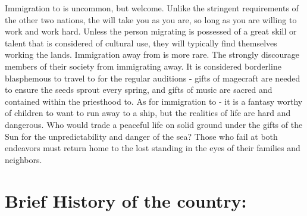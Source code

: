 \documentclass[blue]{GL2020}
\begin{document}
Immigration to \pFarm{} is uncommon, but welcome.  Unlike the stringent requirements of the other two nations, the \pFarm{} will take you as you are, so long as you are willing to work and work hard.  Unless the person migrating is possessed of a great skill or talent that is considered of cultural use, they will typically find themselves working the lands.  Immigration away from \pFarm{} is more rare.  The \pFarmers{} strongly discourage members of their society from immigrating away.  It is considered borderline blasphemous to travel to \pTech{} for the regular auditions - gifts of magecraft are needed to ensure the seeds sprout every spring, and gifts of music are sacred and contained within the priesthood to.  As for immigration to \pShip{} - it is a fantasy worthy of children to want to run away to a \pShippies{} ship, but the realities of \pShip{} life are hard and dangerous.  Who would trade a peaceful life on solid ground under the gifts of the Sun for the unpredictability and danger of the sea?  Those who fail at both endeavors must return home to the lost standing in the eyes of their families and neighbors.


\section*{Brief History of the country:}
\end{document}
